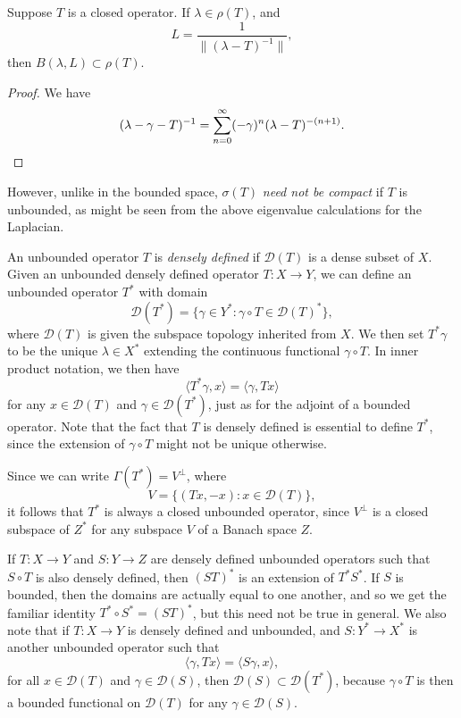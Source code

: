 \begin{lemma}
    Suppose $T$ is a closed operator. If $\lambda \in \rho(T)$, and
    \[ L = \frac{1}{\| (\lambda - T)^{-1} \|}, \]
    then $B(\lambda,L) \subset \rho(T)$.
\end{lemma}
\begin{proof}
    We have
    \[ (\lambda - \gamma - T)^{-1} = \sum_{n = 0}^\infty (-\gamma)^n (\lambda - T)^{-(n+1)}. \qedhere \]
\end{proof}

However, unlike in the bounded space, $\sigma(T)$ \emph{need not be compact} if $T$ is unbounded, as might be seen from the above eigenvalue calculations for the Laplacian.

An unbounded operator $T$ is \emph{densely defined} if $\mathcal{D}(T)$ is a dense subset of $X$. Given an unbounded densely defined operator $T: X \to Y$, we can define an unbounded operator $T^*$ with domain
%
\[ \mathcal{D}(T^*) = \{ \gamma \in Y^*: \gamma \circ T \in \mathcal{D}(T)^* \}, \]
%
where $\mathcal{D}(T)$ is given the subspace topology inherited from $X$. We then set $T^* \gamma$ to be the unique $\lambda \in X^*$ extending the continuous functional $\gamma \circ T$. In inner product notation, we then have
%
\[ \langle T^* \gamma, x \rangle = \langle \gamma, Tx \rangle \]
%
for any $x \in \mathcal{D}(T)$ and $\gamma \in \mathcal{D}(T^*)$, just as for the adjoint of a bounded operator. Note that the fact that $T$ is densely defined is essential to define $T^*$, since the extension of $\gamma \circ T$ might not be unique otherwise.

Since we can write $\Gamma(T^*) = V^\perp$, where
%
\[ V = \{ (Tx,-x): x \in \mathcal{D}(T) \}, \]
%
it follows that $T^*$ is always a closed unbounded operator, since $V^\perp$ is a closed subspace of $Z^*$ for any subspace $V$ of a Banach space $Z$.

If $T: X \to Y$ and $S: Y \to Z$ are densely defined unbounded operators such that $S \circ T$ is also densely defined, then $(ST)^*$ is an extension of $T^* S^*$. If $S$ is bounded, then the domains are actually equal to one another, and so we get the familiar identity $T^* \circ S^* = (ST)^*$, but this need not be true in general. We also note that if $T: X \to Y$ is densely defined and unbounded, and $S: Y^* \to X^*$ is another unbounded operator such that
%
\[ \langle \gamma, Tx \rangle = \langle S\gamma, x \rangle, \]
%
for all $x \in \mathcal{D}(T)$ and $\gamma \in \mathcal{D}(S)$, then $\mathcal{D}(S) \subset \mathcal{D}(T^*)$, because $\gamma \circ T$ is then a bounded functional on $\mathcal{D}(T)$ for any $\gamma \in \mathcal{D}(S)$.

